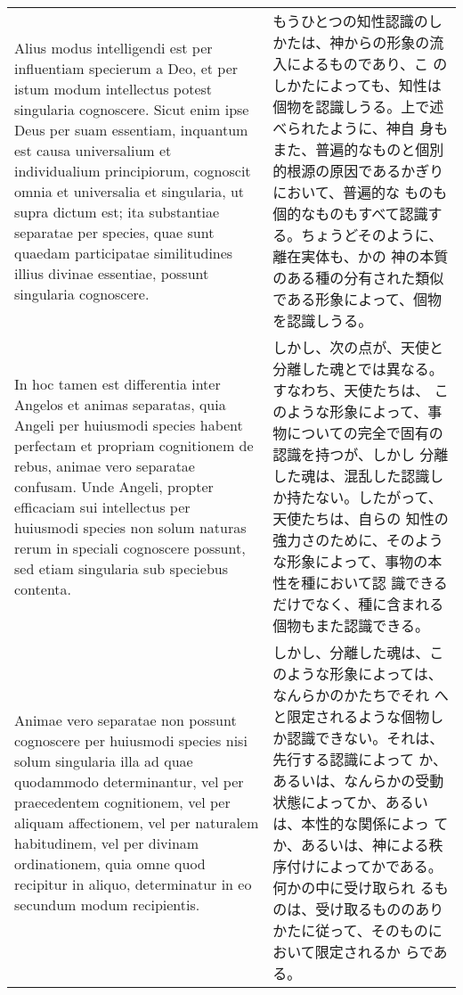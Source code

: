 \documentclass[10pt]{jsarticle} %
\begin{document}
\begin{longtable}{p{21em}p{21em}}
\\




Alius modus intelligendi est per influentiam specierum a Deo, et per
istum modum intellectus potest singularia cognoscere. Sicut enim ipse
Deus per suam essentiam, inquantum est causa universalium et
individualium principiorum, cognoscit omnia et universalia et
singularia, ut supra dictum est; ita substantiae separatae per
species, quae sunt quaedam participatae similitudines illius divinae
essentiae, possunt singularia cognoscere.


&

もうひとつの知性認識のしかたは、神からの形象の流入によるものであり、こ
のしかたによっても、知性は個物を認識しうる。上で述べられたように、神自
身もまた、普遍的なものと個別的根源の原因であるかぎりにおいて、普遍的な
ものも個的なものもすべて認識する。ちょうどそのように、離在実体も、かの
神の本質のある種の分有された類似である形象によって、個物を認識しうる。

\\


In hoc tamen est differentia inter Angelos et animas separatas, quia
Angeli per huiusmodi species habent perfectam et propriam cognitionem
de rebus, animae vero separatae confusam. Unde Angeli, propter
efficaciam sui intellectus per huiusmodi species non solum naturas
rerum in speciali cognoscere possunt, sed etiam singularia sub
speciebus contenta.


&

しかし、次の点が、天使と分離した魂とでは異なる。すなわち、天使たちは、
このような形象によって、事物についての完全で固有の認識を持つが、しかし
分離した魂は、混乱した認識しか持たない。したがって、天使たちは、自らの
知性の強力さのために、そのような形象によって、事物の本性を種において認
識できるだけでなく、種に含まれる個物もまた認識できる。

\\

Animae vero separatae non possunt cognoscere per huiusmodi species
nisi solum singularia illa ad quae quodammodo determinantur, vel per
praecedentem cognitionem, vel per aliquam affectionem, vel per
naturalem habitudinem, vel per divinam ordinationem, quia omne quod
recipitur in aliquo, determinatur in eo secundum modum recipientis.

&

しかし、分離した魂は、このような形象によっては、なんらかのかたちでそれ
へと限定されるような個物しか認識できない。それは、先行する認識によって
か、あるいは、なんらかの受動状態によってか、あるいは、本性的な関係によっ
てか、あるいは、神による秩序付けによってかである。何かの中に受け取られ
るものは、受け取るもののありかたに従って、そのものにおいて限定されるか
らである。


\end{longtable}
\end{document}

